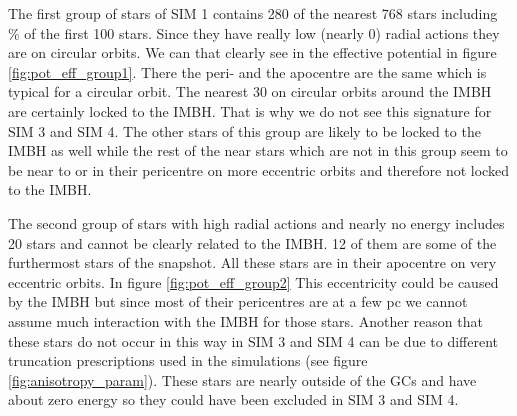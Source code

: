 \par The first group of stars of SIM 1 contains 280 of the nearest 768 stars including \unit[85]{\%} of the first 100 stars. Since they have really low (nearly 0) radial actions they are on circular orbits. We can that clearly see in the effective potential in figure \ref{fig:pot_eff_group1}. There the peri- and the apocentre are the same which is typical for a circular orbit. The nearest 30 on circular orbits around the \ac{IMBH} are certainly locked to the \ac{IMBH}. That is why we do not see this signature for SIM 3 and SIM 4. The other stars of this group are likely to be locked to the \ac{IMBH} as well while the rest of the near stars which are not in this group seem to be near to or in their pericentre on more eccentric orbits and therefore not locked to the \ac{IMBH}. 
\par The second group of stars with high radial actions and nearly no energy includes 20 stars and cannot be clearly related to the \ac{IMBH}. 12 of them are some of  the furthermost stars of the snapshot. All these stars are in their apocentre on very eccentric orbits. In figure \ref{fig:pot_eff_group2} This eccentricity could be caused by the \ac{IMBH} but since most of their pericentres are at a few pc we cannot assume much interaction with the \ac{IMBH} for those stars. Another reason that these stars do not occur in this way in SIM 3 and SIM 4 can be due to different truncation prescriptions used in the simulations (see figure \ref{fig:anisotropy_param}). These stars are nearly outside of the \acp{GC} and have about zero energy so they could have been excluded in SIM 3 and SIM 4. 

